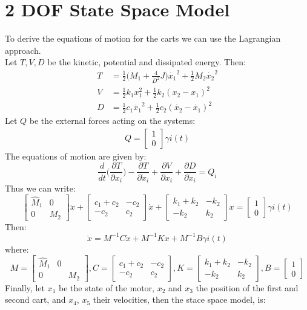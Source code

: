 \section{2 DOF State Space Model}
To derive the equations of motion for the carts we can use the Lagrangian approach.\\ Let $T,V,D$ be the kinetic, potential and dissipated energy. Then:
\begin{align*}
T  &= \frac{1}{2} \Big(M_1 + \frac{4}{D^2}J \Big) \dot{x_1}^2 + \frac{1}{2}M_2 \dot{x_2}^2 \\
V &= \frac{1}{2}k_1x_1^2 + \frac{1}{2}k_2(x_2-x_1)^2 \\
D &= \frac{1}{2}c_1\dot{x_1}^2 + \frac{1}{2}c_2(\dot{x_2}-\dot{x_1})^2
\end{align*}
Let $Q$ be the external forces acting on the systems:
\begin{align*}
Q =\begin{bmatrix} 1 \\ 0 \end{bmatrix} \gamma i(t)
\end{align*}
The equations of motion are given by:
$$\frac{d}{dt}\Big(\frac{\partial T}{\partial x_i} \Big) -\frac{\partial T}{\partial \dot{x}_i} + \frac{\partial V}{\partial x_i} + \frac{\partial D}{\partial \dot{x}_i} = Q_i$$
Thus we can write:
$$
\begin{bmatrix}
\hat{M}_1 & 0 \\
0 & M_2
\end{bmatrix}
\ddot{x} + 
\begin{bmatrix}
c_1+c_2 & -c_2 \\
-c_2 & c_2
\end{bmatrix}
\dot{x}+
\begin{bmatrix}
k_1+k_2 & -k_2 \\
-k_2 & k_2
\end{bmatrix}
x = \begin{bmatrix} 1 \\ 0 \end{bmatrix}\gamma i(t)$$
Then:
$$\ddot{x} = M^{-1}C\dot{x}+M^{-1}Kx+ M^{-1}B\gamma i(t)$$
where:
$$M=\begin{bmatrix}
\hat{M}_1 & 0 \\
0 && M_2
\end{bmatrix}, C=\begin{bmatrix}
c_1+c_2 & -c_2 \\
-c_2 & c_2
\end{bmatrix}, K=\begin{bmatrix}
k_1+k_2 & -k_2 \\
-k_2 & k_2
\end{bmatrix}, B=\begin{bmatrix}1\\ 0 \end{bmatrix}$$
Finally, let $x_1$ be the state of the motor, $x_2$ and $x_3$ the position of the first and second cart, and $x_4$, $x_5$ their velocities, then the stace space model, is:

